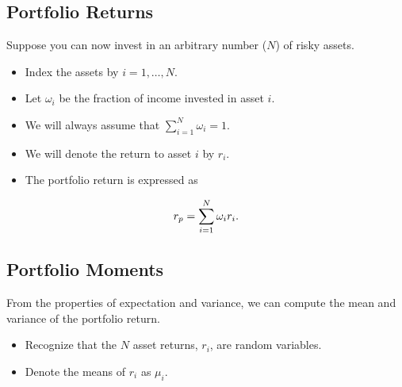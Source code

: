 \documentclass[letterpaper,10pt,english]{sphinxmanual}
\begin{document}
\subsection{Portfolio Returns}
\label{multiAssetOpt:portfolio-returns}
Suppose you can now invest in an arbitrary number ($N$) of risky
assets.
\begin{itemize}
\item {} 
Index the assets by $i = 1, \ldots, N$.

\end{itemize}
\begin{itemize}
\item {} 
Let $\omega_i$ be the fraction of income invested in asset $i$.

\end{itemize}
\begin{itemize}
\item {} 
We will always assume that $\sum_{i=1}^N \omega_i = 1$.

\end{itemize}
\begin{itemize}
\item {} 
We will denote the return to asset $i$ by $r_i$.

\end{itemize}
\begin{itemize}
\item {} 
The portfolio return is expressed as

\end{itemize}
\begin{gather}
\begin{split}r_p = \sum_{i=1}^N \omega_i r_i.\end{split}\notag
\end{gather}

\subsection{Portfolio Moments}
\label{multiAssetOpt:portfolio-moments}
From the properties of expectation and variance, we can compute the
mean and variance of the portfolio return.
\begin{itemize}
\item {} 
Recognize that the $N$ asset returns, $r_i$, are random
variables.

\end{itemize}
\begin{itemize}
\item {} 
Denote the means of $r_i$ as $\mu_i$.

\end{itemize}
\end{document}
